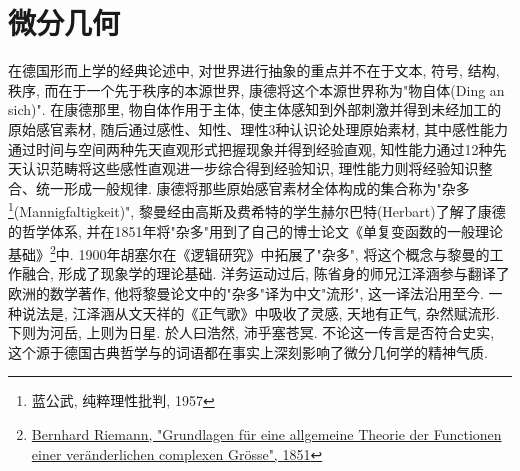 \part{微分几何}
在德国形而上学的经典论述中, 对世界进行抽象的重点并不在于文本, 符号, 结构, 秩序, 而在于一个先于秩序的本源世界, 康德将这个本源世界称为"物自体(Ding an sich)". 在康德那里, 物自体作用于主体, 使主体感知到外部刺激并得到未经加工的原始感官素材, 随后通过感性、知性、理性3种认识论处理原始素材, 其中感性能力通过时间与空间两种先天直观形式把握现象并得到经验直观, 知性能力通过12种先天认识范畴将这些感性直观进一步综合得到经验知识, 理性能力则将经验知识整合、统一形成一般规律. 康德将那些原始感官素材全体构成的集合称为"杂多\footnote{蓝公武, 纯粹理性批判, 1957}(Mannigfaltigkeit)", 黎曼经由高斯及费希特的学生赫尔巴特(Herbart)了解了康德的哲学体系, 并在1851年将"杂多"用到了自己的博士论文《单复变函数的一般理论基础》\footnote{\href{https://www.emis.de/classics/Riemann/Grund.pdf}{Bernhard Riemann, "Grundlagen für eine allgemeine Theorie der Functionen einer veränderlichen complexen Grösse", 1851}}中. 1900年胡塞尔在《逻辑研究》中拓展了"杂多", 将这个概念与黎曼的工作融合, 形成了现象学的理论基础. 洋务运动过后, 陈省身的师兄江泽涵参与翻译了欧洲的数学著作, 他将黎曼论文中的"杂多"译为中文"流形", 这一译法沿用至今. 一种说法是, 江泽涵从文天祥的《正气歌》中吸收了灵感, 天地有正气, 杂然赋流形. 下则为河岳, 上则为日星. 於人曰浩然, 沛乎塞苍冥. 不论这一传言是否符合史实, 这个源于德国古典哲学与的词语都在事实上深刻影响了微分几何学的精神气质.


\newpage

\newpage
